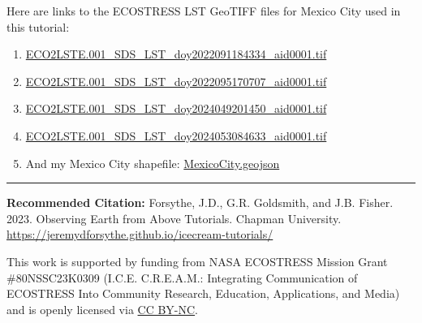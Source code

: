 \documentclass[oneside,a4paper,11pt,explicit]{book}
\begin{document}
\begin{tcolorbox}[colback=yellow!5!white,title=\textbf{Datafiles}]
	\large
	Here are links to the ECOSTRESS LST GeoTIFF files for Mexico City used in this tutorial:

    \begin{enumerate}
        \item \href{https://jeremydforsythe.github.io/icecream-tutorials/Tutorial11_RasterCalculator/ECO2LSTE.001_SDS_LST_doy2022091184334_aid0001.tif}{\small ECO2LSTE.001\_SDS\_LST\_doy2022091184334\_aid0001.tif}
        \item \href{https://jeremydforsythe.github.io/icecream-tutorials/Tutorial11_RasterCalculator/ECO2LSTE.001_SDS_LST_doy2022095170707_aid0001.tif}{\small ECO2LSTE.001\_SDS\_LST\_doy2022095170707\_aid0001.tif}
        \item \href{https://jeremydforsythe.github.io/icecream-tutorials/Tutorial11_RasterCalculator/ECO2LSTE.001_SDS_LST_doy2024049201450_aid0001.tif}{\small ECO2LSTE.001\_SDS\_LST\_doy2024049201450\_aid0001.tif}
        \item \href{https://jeremydforsythe.github.io/icecream-tutorials/Tutorial11_RasterCalculator/ECO2LSTE.001_SDS_LST_doy2024053084633_aid0001.tif}{\small ECO2LSTE.001\_SDS\_LST\_doy2024053084633\_aid0001.tif}
        \item And my Mexico City shapefile: \href{https://jeremydforsythe.github.io/icecream-tutorials/Tutorial10_ESI/MexicoCityPolygon/MexicoCity.geojson}{\small MexicoCity.geojson}
    \end{enumerate}
\end{tcolorbox}

\vfill

\hrule

\vspace{1em}

\small \textbf{Recommended Citation:} Forsythe, J.D., G.R. Goldsmith, and J.B. Fisher. 2023. Observing Earth from Above Tutorials. Chapman University. \url{https://jeremydforsythe.github.io/icecream-tutorials/}

\vspace{1em}

This work is supported by funding from NASA ECOSTRESS Mission Grant \#80NSSC23K0309 (I.C.E. C.R.E.A.M.: Integrating Communication of ECOSTRESS Into Community Research, Education, Applications, and Media) and is openly licensed via \href{https://creativecommons.org/licenses/by-nc/4.0/}{CC BY-NC}.
\end{document}
